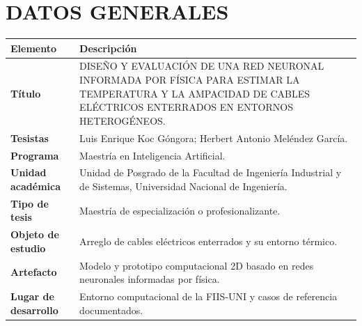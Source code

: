 \documentclass[11pt,a4paper,oneside]{report}
\newcommand{\tituloTesis}{DISEÑO Y EVALUACIÓN DE UNA RED NEURONAL INFORMADA POR FÍSICA PARA ESTIMAR LA TEMPERATURA Y LA AMPACIDAD DE CABLES ELÉCTRICOS ENTERRADOS EN ENTORNOS HETEROGÉNEOS}
\begin{document}
\chapter*{DATOS GENERALES}
\begin{tabularx}{\textwidth}{>{\bfseries\RaggedRight\arraybackslash}p{4.1cm}J}
\toprule
{}
Elemento & Descripción \\
\midrule
Título & \tituloTesis. \\
Tesistas & Luis Enrique Koc Góngora; Herbert Antonio Meléndez García. \\
Programa & Maestría en Inteligencia Artificial. \\
Unidad académica & Unidad de Posgrado de la Facultad de Ingeniería Industrial y de Sistemas, Universidad Nacional de Ingeniería. \\
Tipo de tesis & Maestría de especialización o profesionalizante. \\
Objeto de estudio & Arreglo de cables eléctricos enterrados y su entorno térmico. \\
Artefacto & Modelo y prototipo computacional 2D basado en redes neuronales informadas por física. \\
Lugar de desarrollo & Entorno computacional de la FIIS-UNI y casos de referencia documentados. \\
\bottomrule
\end{tabularx}





\begingroup
\singlespacing
\tableofcontents
\listoffigures
\listoftables
\listofformulas
\endgroup




\clearpage
{}






\clearpage
\begin{singlespace}
\printbibliography[heading=bibintoc,title={REFERENCIAS}]
\end{singlespace}


\end{document}

